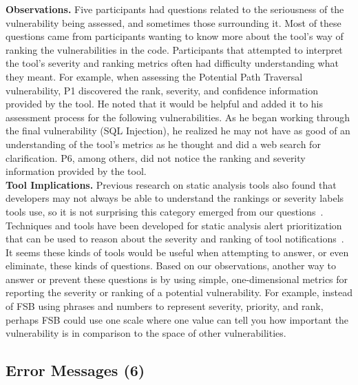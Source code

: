 \documentclass[conference]{IEEEtran}
\begin{document}
\noindent\textbf{Observations.}
Five participants had questions related to the seriousness of the vulnerability being assessed, and sometimes those surrounding it. 
Most of these questions came from participants wanting to know more about the tool's way of ranking the vulnerabilities in the code.
Participants that attempted to interpret the tool's severity and ranking metrics often had difficulty understanding what they meant. 
For example, when assessing the Potential Path Traversal vulnerability, P1 discovered the rank, severity, and confidence information provided by the tool. 
He noted that it would be helpful and added it to his assessment process for the following vulnerabilities.
As he began working through the final vulnerability (SQL Injection), he realized he may not have as good of an understanding of the tool's metrics as he thought and did a web search for clarification. 
P6, among others, did not notice the ranking and severity information provided by the tool. 
\\

\noindent\textbf{Tool Implications.}
Previous research on static analysis tools also found that developers may not always be able to understand the rankings or severity labels tools use, so it is not surprising this category emerged from our questions~\cite{johnson2013don}.
Techniques and tools have been developed for static analysis alert prioritization that can be used to reason about the severity and ranking of tool notifications~\cite{kim2007prioritizing, boogerd2006prioritizing, kremenek2004correlation}.
It seems these kinds of tools would be useful when attempting to answer, or even eliminate, these kinds of questions. 
Based on our observations, another way to answer or prevent these questions is by using simple, one-dimensional metrics for reporting the severity or ranking of a potential vulnerability.
For example, instead of FSB using phrases and numbers to represent severity, priority, and rank, perhaps FSB could use one scale where one value can tell you how important the vulnerability is in comparison to the space of other vulnerabilities.


\noindent\subsection{\textbf{Error Messages (6)}}\label{em}
\end{document}
